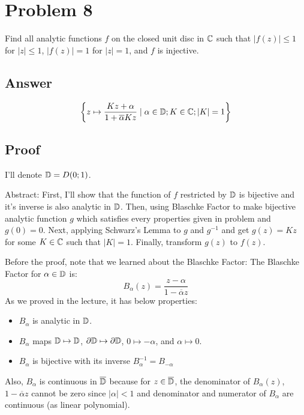 \section*{Problem 8}

Find all analytic functions \(f\) on the closed unit disc in \(\mathbb{C}\) such that
\(|f(z)| \le 1\) for \(|z| \le 1\),
\(|f(z)| = 1\) for \(|z| = 1\),
and \(f\) is injective.

\subsection*{Answer}
\[\left\{z \mapsto \frac{Kz + \alpha}{1 + \overline{\alpha}Kz}
  \mid
  \alpha \in \mathbb{D};
  K \in \mathbb{C};
  |K| = 1
  \right\}\]

\subsection*{Proof}

I'll denote \(\mathbb{D} = D(0; 1)\).
\newline

\noindent
Abstract:
First, I'll show that the function of \(f\) restricted by \(\mathbb{D}\) is bijective and it's inverse is also analytic in \(\mathbb{D}\).
Then, using Blaschke Factor to make bijective analytic function \(g\) which satisfies every properties given in problem and \(g(0) = 0\).
Next, applying Schwarz's Lemma to \(g\) and \(g^{-1}\) and get \(g(z) = Kz\) for some \(K \in \mathbb{C}\) such that \(|K| = 1\).
Finally, transform \(g(z)\) to \(f(z)\).
\newline

\noindent
Before the proof, note that we learned about the Blaschke Factor:
The Blaschke Factor for \(\alpha \in \mathbb{D}\) is:
\[B_\alpha(z) = \frac{z - \alpha}{1 - \overline{\alpha}z}\]
As we proved in the lecture, it has below properties:
\begin{itemize}
\item \(B_\alpha\) is analytic in \(\mathbb{D}\).
\item \(B_\alpha\) maps \(\mathbb{D} \mapsto \mathbb{D}\), \(\partial\mathbb{D} \mapsto \partial\mathbb{D}\), \(0 \mapsto -\alpha\), and \(\alpha \mapsto 0\).
\item \(B_\alpha\) is bijective with its inverse \(B_\alpha^{-1} = B_{-\alpha}\)
\end{itemize}
Also, \(B_\alpha\) is continuous in \(\overline{\mathbb{D}}\) because for \(z \in \overline{\mathbb{D}}\), the denominator of \(B_\alpha(z)\), \(1 - \overline{\alpha}z\) cannot be zero since \(|\alpha| < 1\) and denominator and numerator of \(B_\alpha\) are continuous (as linear polynomial).
\newline


